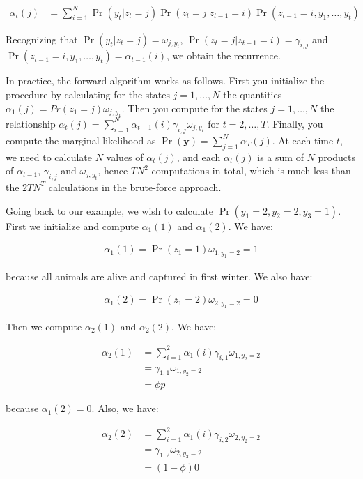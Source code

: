 \documentclass[
  12pt,
]{krantz}
\begin{document}
\begin{align*}
\alpha_t(j) &= \sum_{i=1}^N \Pr(y_t | z_t = j) \Pr(z_t = j | z_{t-1} = i) \Pr(z_{t-1} = i, y_1, \ldots, y_t)
\end{align*}

Recognizing that \(\Pr(y_{t}|z_{t}=j)=\omega_{j,y_t}\), \(\Pr(z_{t} = j | z_{t-1} = i) = \gamma_{i,j}\) and \(\Pr(z_{t-1} = i, y_1, \ldots, y_t) = \alpha_{t-1}(i)\), we obtain the recurrence.

In practice, the forward algorithm works as follows. First you initialize the procedure by calculating for the states \(j=1,\ldots,N\) the quantities \(\alpha_1(j) = Pr(z_1 = j) \omega_{j,y_1}\). Then you compute for the states \(j=1,\ldots,N\) the relationship \(\alpha_t(j) = \displaystyle{\sum_{i=1}^N \alpha_{t-1}(i) \gamma_{i,j} \omega_{j,y_t}}\) for \(t = 2, \ldots, T\). Finally, you compute the marginal likelihood as \(\Pr(\mathbf{y}) = \displaystyle{\sum_{j=1}^N\alpha_T(j)}\). At each time \(t\), we need to calculate \(N\) values of \(\alpha_t(j)\), and each \(\alpha_t(j)\) is a sum of \(N\) products of \(\alpha_{t-1}\), \(\gamma_{i,j}\) and \(\omega_{j,y_t}\), hence \(TN^2\) computations in total, which is much less than the \(2TN^T\) calculations in the brute-force approach.

Going back to our example, we wish to calculate \(\Pr(y_1 = 2, y_2 = 2, y_3 = 1)\). First we initialize and compute \(\alpha_1(1)\) and \(\alpha_1(2)\). We have:

\begin{align*}
\alpha_1(1) = \Pr(z_1=1) \omega_{1,y_1=2} = 1
\end{align*}

because all animals are alive and captured in first winter. We also have:

\begin{align*}
\alpha_1(2) = \Pr(z_1=2) \omega_{2,y_1=2} = 0
\end{align*}

Then we compute \(\alpha_2(1)\) and \(\alpha_2(2)\). We have:

\begin{align*}
\alpha_2(1) &= \sum_{i=1}^2 \alpha_1(i) \gamma_{i,1} \omega_{1,y_2=2}\\
            &= \gamma_{1,1} \omega_{1,y_2=2}\\
            &= \phi p
\end{align*}

because \(\alpha_1(2) = 0\). Also, we have:

\begin{align*}
\alpha_2(2) &= \sum_{i=1}^2 \alpha_1(i) \gamma_{i,2} \omega_{2,y_2=2}\\
            &= \gamma_{1,2} \omega_{2,y_2=2}\\
            &= (1-\phi) 0
\end{align*}
\end{document}

